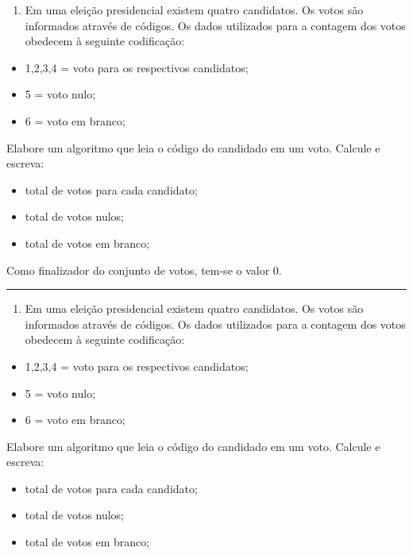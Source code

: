 \documentclass[12pt,a4paper]{article}
\providecommand{\tightlist}{%
      \setlength{\itemsep}{0pt}\setlength{\parskip}{0pt}}
\begin{document}
\begin{enumerate}
\def\labelenumi{\arabic{enumi}.}
\setcounter{enumi}{8}
\tightlist
\item
  Em uma eleição presidencial existem quatro candidatos. Os votos são
  informados através de códigos. Os dados utilizados para a contagem dos
  votos obedecem à seguinte codificação:
\end{enumerate}

\begin{itemize}
\item
  1,2,3,4 = voto para os respectivos candidatos;
\item
  5 = voto nulo;
\item
  6 = voto em branco;
\end{itemize}

Elabore um algoritmo que leia o código do candidado em um voto. Calcule
e escreva:

\begin{itemize}
\item
  total de votos para cada candidato;
\item
  total de votos nulos;
\item
  total de votos em branco;
\end{itemize}

Como finalizador do conjunto de votos, tem-se o valor 0.

    \begin{center}\rule{0.5\linewidth}{0.5pt}\end{center}

\begin{enumerate}
\def\labelenumi{\arabic{enumi}.}
\setcounter{enumi}{9}
\tightlist
\item
  Em uma eleição presidencial existem quatro candidatos. Os votos são
  informados através de códigos. Os dados utilizados para a contagem dos
  votos obedecem à seguinte codificação:
\end{enumerate}

\begin{itemize}
\item
  1,2,3,4 = voto para os respectivos candidatos;
\item
  5 = voto nulo;
\item
  6 = voto em branco;
\end{itemize}

Elabore um algoritmo que leia o código do candidado em um voto. Calcule
e escreva:

\begin{itemize}
\item
  total de votos para cada candidato;
\item
  total de votos nulos;
\item
  total de votos em branco;
\end{itemize}
\end{document}
